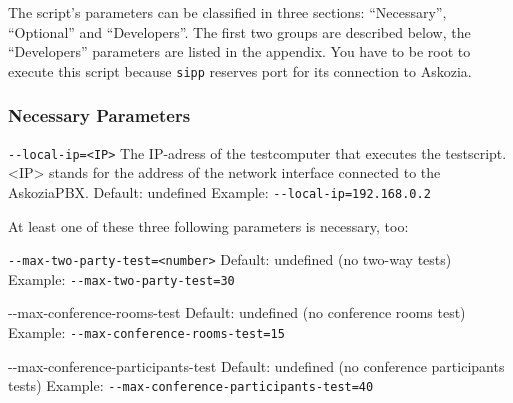 The script's parameters can be classified in three sections: ``Necessary'', ``Optional'' and ``Developers''.
The first two groups are described below, the ``Developers'' parameters are listed in the appendix.
You have to be root to execute this script because \texttt{sipp} reserves port for its connection to Askozia.

\subsubsection{Necessary Parameters}%

\begin{description}
\item {\texttt{-{}-local-ip=<IP>}} \newline
The IP-adress of the testcomputer that executes the testscript.
<IP> stands for the address of the network interface connected to the AskoziaPBX.
\newline Default: undefined
\newline Example: \texttt{-{}-local-ip=192.168.0.2}
\end{description}

At least one of these three following parameters is necessary, too:
\begin{description}

\item {\texttt{-{}-max-two-party-test=<number>}}
\newline Default: undefined (no two-way tests)
\newline Example: \texttt{-{}-max-two-party-test=30}

\item {-{}-max-conference-rooms-test}
\newline Default: undefined (no conference rooms test)
\newline Example: \texttt{-{}-max-conference-rooms-test=15}

\item {-{}-max-conference-participants-test}
\newline Default: undefined (no conference participants tests)
\newline Example: \texttt{-{}-max-conference-participants-test=40}

\end{description}
